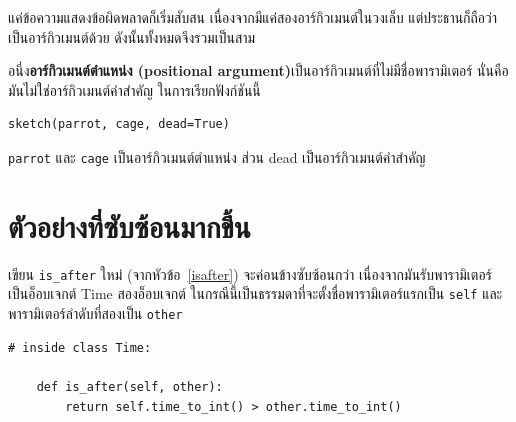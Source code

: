 แค่ข้อความแสดงข้อผิดพลาดก็เริ่มสับสน เนื่องจากมีแค่สองอาร์กิวเมนต์ในวงเล็บ แต่ประธานก็ถือว่าเป็นอาร์กิวเมนต์ด้วย ดังนั้นทั้งหมดจึงรวมเป็นสาม


อนึ่ง{\bf อาร์กิวเมนต์ตำแหน่ง (positional argument)}เป็นอาร์กิวเมนต์ที่ไม่มีชื่อพารามิเตอร์ นั่นคือมันไม่ใช่อาร์กิวเมนต์คำสำคัญ ในการเรียกฟังก์ชันนี้

\begin{verbatim}
sketch(parrot, cage, dead=True)
\end{verbatim}


{\tt parrot} และ {\tt cage} เป็นอาร์กิวเมนต์ตำแหน่ง ส่วน dead เป็นอาร์กิวเมนต์คำสำคัญ



\section{ตัวอย่างที่ซับซ้อนมากขึ้น} %


เขียน \verb"is_after" ใหม่ (จากหัวข้อ~\ref{isafter}) จะค่อนข้างซับซ้อนกว่า เนื่องจากมันรับพารามิเตอร์เป็นอ็อบเจกต์ Time สองอ็อบเจกต์ 
ในกรณีนี้เป็นธรรมดาที่จะตั้งชื่อพารามิเตอร์แรกเป็น {\tt self} และพารามิเตอร์ลำดับที่สองเป็น {\tt other}

\begin{verbatim}
# inside class Time:

    def is_after(self, other):
        return self.time_to_int() > other.time_to_int()
\end{verbatim}
%

